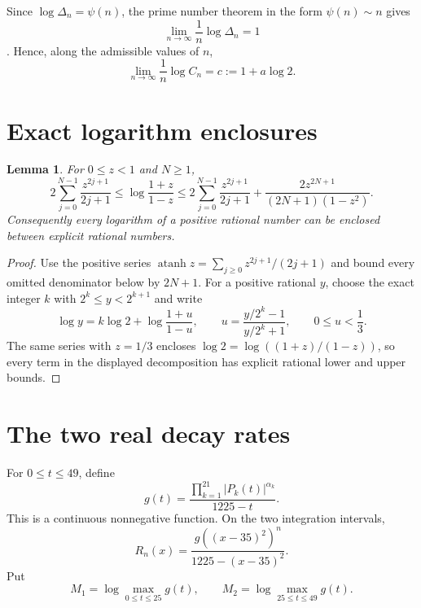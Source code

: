 \documentclass[preprint,12pt]{elsarticle}
\newtheorem{lemma}[theorem]{Lemma}
\theoremstyle{definition}
\newcommand{\abs}[1]{\left|#1\right|}
\begin{document}
Since $\log\Delta_n=\psi(n)$, the prime number theorem in the form
$\psi(n)\sim n$ gives
\[
 \lim_{n\to\infty}\frac1n\log\Delta_n=1
\]
\cite[Ch.~6]{MontgomeryVaughan2007}.  Hence, along the admissible values of
$n$,
\begin{equation}\label{eq:cdef}
 \lim_{n\to\infty}\frac1n\log C_n
 =c:=1+a\log2.
\end{equation}

\section{Exact logarithm enclosures}\label{sec:log-enclosure}

\begin{lemma}\label{lem:log-enclosure}
For $0\le z<1$ and $N\ge1$,
\[
 2\sum_{j=0}^{N-1}\frac{z^{2j+1}}{2j+1}
 \le\log\frac{1+z}{1-z}
 \le
 2\sum_{j=0}^{N-1}\frac{z^{2j+1}}{2j+1}
 +\frac{2z^{2N+1}}{(2N+1)(1-z^2)}.
\]
Consequently every logarithm of a positive rational number can be enclosed
between explicit rational numbers.
\end{lemma}

\begin{proof}
Use the positive series
$\operatorname{atanh}z=\sum_{j\ge0}z^{2j+1}/(2j+1)$ and bound every omitted
denominator below by $2N+1$.  For a positive rational $y$, choose the exact
integer $k$ with $2^k\le y<2^{k+1}$ and write
\[
 \log y=k\log2+
 \log\frac{1+u}{1-u},
 \qquad
 u=\frac{y/2^k-1}{y/2^k+1},\qquad 0\le u<\frac13.
\]
The same series with $z=1/3$ encloses
$\log2=\log((1+z)/(1-z))$, so every term in the displayed decomposition has
explicit rational lower and upper bounds.
\end{proof}

\section{The two real decay rates}

For $0\le t\le49$, define
\begin{equation}\label{eq:g}
 g(t)=\frac{\prod_{k=1}^{21}\abs{P_k(t)}^{\alpha_k}}{1225-t}.
\end{equation}
This is a continuous nonnegative function.  On the two integration
intervals,
\begin{equation}\label{eq:Rn-g}
 R_n(x)=
 \frac{g((x-35)^2)^n}{1225-(x-35)^2}.
\end{equation}
Put
\begin{equation}\label{eq:M12}
 M_1=\log\max_{0\le t\le25}g(t),
 \qquad
 M_2=\log\max_{25\le t\le49}g(t).
\end{equation}
\end{document}
